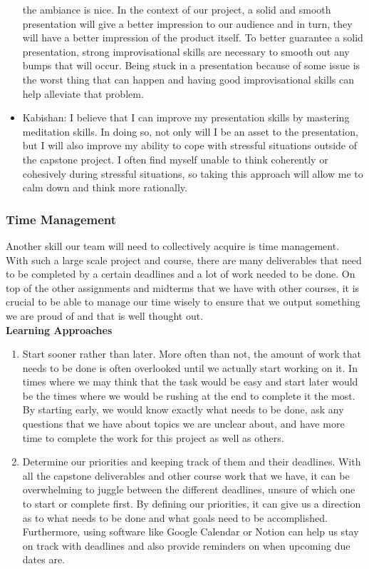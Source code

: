 \documentclass[12pt,letterpaper]{article}
\begin{document}
\begin{itemize}
    the ambiance is nice. In the context of our project, a solid and smooth
    presentation will give a better impression to our audience and in turn, they
    will have a better impression of the product itself. To better guarantee a
    solid presentation, strong improvisational skills are necessary to smooth
    out any bumps that will occur. Being stuck in a presentation because of some
    issue is the worst thing that can happen and having good improvisational
    skills can help alleviate that problem.
    \item Kabishan: I believe that I can improve my presentation skills by
    mastering meditation skills. In doing so, not only will I be an asset to the
    presentation, but I will also improve my ability to cope with stressful
    situations outside of the capstone project. I often find myself unable to
    think coherently or cohesively during stressful situations, so taking this
    approach will allow me to calm down and think more rationally.
\end{itemize}

\subsubsection{Time Management}
Another skill our team will need to collectively acquire is time management.
With such a large scale project and course, there are many deliverables that
need to be completed by a certain deadlines and a lot of work needed to be done.
On top of the other assignments and midterms that we have with other courses, it
is crucial to be able to manage our time wisely to ensure that we output
something we are proud of and that is well thought out. \\[.1in]
\noindent \textbf{Learning Approaches}
\begin{enumerate}
    \item Start sooner rather than later. More often than not, the amount of
    work that needs to be done is often overlooked until we actually start
    working on it. In times where we may think that the task would be easy and
    start later would be the times where we would be rushing at the end to
    complete it the most. By starting early, we would know exactly what needs to
    be done, ask any questions that we have about topics we are unclear about,
    and have more time to complete the work for this project as well as others. 
    \item Determine our priorities and keeping track of them and their
    deadlines. With all the capstone deliverables and other course work that we
    have, it can be overwhelming to juggle between the different deadlines,
    unsure of which one to start or complete first. By defining our priorities,
    it can give us a direction as to what needs to be done and what goals need
    to be accomplished. Furthermore, using software like Google Calendar or
    Notion can help us stay on track with deadlines and also provide reminders
    on when upcoming due dates are.
\end{enumerate}
\end{document}
